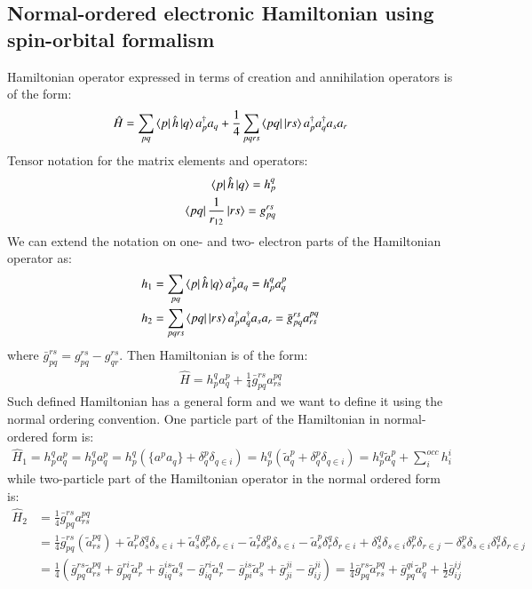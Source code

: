 \documentclass[journal=jacsat]{achemso}
\numberwithin{equation}{section}
\begin{document}
\subsection{Normal-ordered electronic Hamiltonian using spin-orbital formalism}
Hamiltonian operator expressed in terms of creation and annihilation operators is of the form:
\begin{align}
\hat{H} = \sum_{pq}\bra{p}\hat{h}\ket{q}a^{\dagger}_{p}a_{q}+\frac{1}{4}\sum_{pqrs}\bra{pq}\ket{rs}a_{p}^{\dagger}a_{q}^{\dagger}a_{s}a_{r}
\end{align}
Tensor notation for the matrix elements and operators:
\begin{align}
\bra{p}\hat{h}\ket{q}=h^{q}_{p}\\
\bra{pq}\frac{1}{r_{12}}\ket{rs}=g^{rs}_{pq}
\end{align}
We can extend the notation on one- and two- electron parts of the Hamiltonian operator as:
\begin{align}
h_{1}&=\sum_{pq}\bra{p}\hat{h}\ket{q}a^{\dagger}_{p}a_{q}=h^{q}_{p}a^{p}_{q}\\
h_{2}&=\sum_{pqrs}\bra{pq}\ket{rs}a_{p}^{\dagger}a_{q}^{\dagger}a_{s}a_{r}=\bar{g}^{rs}_{pq}a^{pq}_{rs}
\end{align}
where $\bar{g}^{rs}_{pq} = g^{rs}_{pq} - g^{rs}_{qr}$. Then Hamiltonian is of the form:
\begin{align}
\hat{H}=h^{q}_{p}a^{p}_{q}+\frac{1}{4}\bar{g}^{rs}_{pq}a^{pq}_{rs}
\end{align}
Such defined Hamiltonian has a general form and we want to define it using the normal ordering convention. One particle part of the Hamiltonian in normal-ordered form is:
\begin{align}
\hat{H}_{1}=h^{q}_{p}a^{p}_{q}=h^{q}_{p}a^{p}_{q}=h^{q}_{p}(\{a^{p}a_{q}\}+\delta^{p}_{q}\delta_{q\in i})=h^{q}_{p}(\tilde{a}^{p}_{q}+\delta^{p}_{q}\delta_{q\in i})=h^{q}_{p}\tilde{a}^{p}_{q}+\sum_{i}^{occ}h^{i}_{i}
\end{align}
while two-particle part of the Hamiltonian operator in the normal ordered form is:
\begin{align}
\hat{H}_{2}&=\frac{1}{4}\bar{g}_{pq}^{rs}a^{pq}_{rs}\\\nonumber
&=\frac{1}{4}\bar{g}_{pq}^{rs}(\tilde{a}^{pq}_{rs})+\tilde{a}^{p}_{r}\delta^{q}_{s}\delta_{s\in i} + \tilde{a}^{q}_{s}\delta^{p}_{r}\delta_{r\in i} - \tilde{a}^{q}_{r}\delta^{p}_{s}\delta_{s\in i} - 
\tilde{a}^{p}_{s}\delta^{q}_{r}\delta_{r\in i} + \delta^{q}_{s}\delta_{s\in i}\delta^{p}_{r}\delta_{r\in j} - \delta^{p}_{s}\delta_{s\in i}\delta^{q}_{r}\delta_{r\in j}\\\nonumber
&=\frac{1}{4}(\bar{g}^{rs}_{pq}\tilde{a}^{pq}_{rs}+\bar{g}^{ri}_{pq}\tilde{a}^{p}_{r}+\bar{g}^{is}_{iq}\tilde{a}^{q}_{s}-\bar{g}^{ri}_{iq}\tilde{a}^{q}_{r}-\bar{g}^{is}_{pi}\tilde{a}^{p}_{s}+\bar{g}^{ji}_{ji}-\bar{g}^{ji}_{ij})=\frac{1}{4}\bar{g}^{rs}_{pq}\tilde{a}^{pq}_{rs}+\bar{g}^{qi}_{pq}\tilde{a}^{p}_{q}+\frac{1}{2}\bar{g}^{ij}_{ij}
\end{align}
\end{document}
